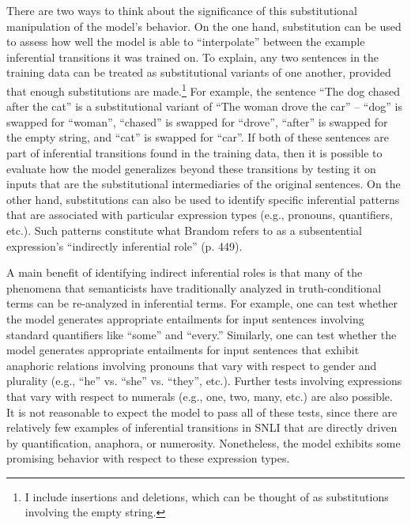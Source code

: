 There are two ways to think about the significance of this substitutional manipulation of the model's behavior. On the one hand, substitution can be used to assess how well the model is able to ``interpolate'' between the example inferential transitions it was trained on. To explain, any two sentences in the training data can be treated as substitutional variants of one another, provided that enough substitutions are made.\footnote{I include insertions and deletions, which can be thought of as substitutions involving the empty string.} For example, the sentence ``The dog chased after the cat'' is a substitutional variant of ``The woman drove the car'' -- ``dog'' is swapped for ``woman'', ``chased'' is swapped for ``drove'', ``after'' is swapped for the empty string, and ``cat'' is swapped for ``car''. If both of these sentences are part of inferential transitions found in the training data, then it is possible to evaluate how the model generalizes beyond these transitions by testing it on inputs that are the substitutional intermediaries of the original sentences. On the other hand, substitutions can also be used to identify specific inferential patterns that are associated with particular expression types (e.g., pronouns, quantifiers, etc.). Such patterns constitute what Brandom refers to as a subsentential expression's ``indirectly inferential role'' (p. 449). 

A main benefit of identifying indirect inferential roles is that many of the phenomena that semanticists have traditionally analyzed in truth-conditional terms can be re-analyzed in inferential terms. For example, one can test whether the model generates appropriate entailments for input sentences involving standard quantifiers like ``some'' and ``every.'' Similarly, one can test whether the model generates appropriate entailments for input sentences that exhibit anaphoric relations involving pronouns that vary with respect to gender and plurality (e.g., ``he'' vs. ``she'' vs. ``they'', etc.). Further tests involving expressions that vary with respect to numerals (e.g., one, two, many, etc.) are also possible. It is not reasonable to expect the model to pass all of these tests, since there are relatively few examples of inferential transitions in SNLI that are directly driven by quantification, anaphora, or numerosity. Nonetheless, the model exhibits some promising behavior with respect to these expression types.


